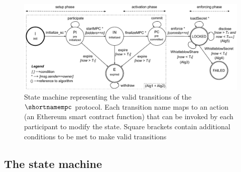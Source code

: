

\begin{figure}[t]
	\centering
	\includegraphics[width=1.0\textwidth]{fig/protocol_fsm_simple_version.pdf}
	\caption{State machine representing the valid transitions of the $\shortnamempc$ protocol. Each transition name maps to an action (an Ethereum smart contract function) that can be invoked by each participant to modify the state. Square brackets contain additional conditions to be met to make valid transitions}
	\label{fig:fsm}
\end{figure}

\subsection{The \shortname state machine}\label{sect:ityt_exec}
 
